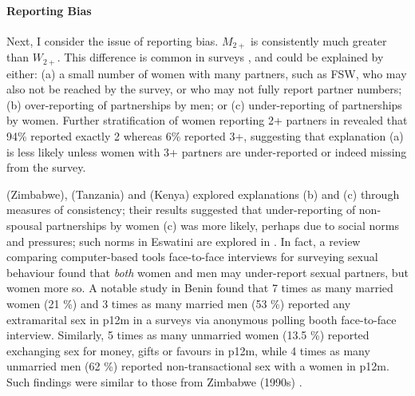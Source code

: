 \paragraph{Reporting Bias}
Next, I consider the issue of reporting bias.
$M_{2+}$ is consistently much greater than $W_{2+}$.
This difference is common in surveys \cite{Todd2009,Higgins2010}, and could be explained by either:
(a) a small number of women with many partners,
such as FSW, who may also not be reached by the survey,
or who may not fully report partner numbers;
(b) over-reporting of partnerships by men; or
(c) under-reporting of partnerships by women.
Further stratification of women reporting 2+ partners in \cite[Table~14.7.1]{SDHS2006}
revealed that 94\% reported exactly 2 whereas 6\% reported 3+,
suggesting that explanation (a) is less likely unless
women with 3+ partners are under-reported or indeed missing from the survey.
\par
\citet{Gregson2002} (Zimbabwe), \citet{Nnko2004} (Tanzania) and \citet{Clark2011} (Kenya)
explored explanations (b) and (c) through measures of consistency; their results suggested that
under-reporting of non-spousal partnerships by women (c) was more likely,
perhaps due to social norms and pressures;
such norms in Eswatini are explored in \cite{Ruark2014,Fielding-Miller2016,Ruark2019,Pulerwitz2021}.
In fact, a review comparing computer-based tools \vs face-to-face interviews
for surveying sexual behaviour \cite{Langhaug2010} found that
\emph{both} women and men may under-report sexual partners, but women more so.
A notable study in Benin \cite{Behanzin2013} found that
7 times as many married women (21 \%) and 3 times as many married men (53 \%)
reported any extramarital sex in p12m
in a surveys via anonymous polling booth \vs face-to-face interview.
Similarly, 5 times as many unmarried women (13.5 \%) reported
exchanging sex for money, gifts or favours in p12m, while
4 times as many unmarried men (62 \%) reported non-transactional sex with a women in p12m.
Such findings were similar to those from Zimbabwe (1990s) \cite{Gregson2002}.
